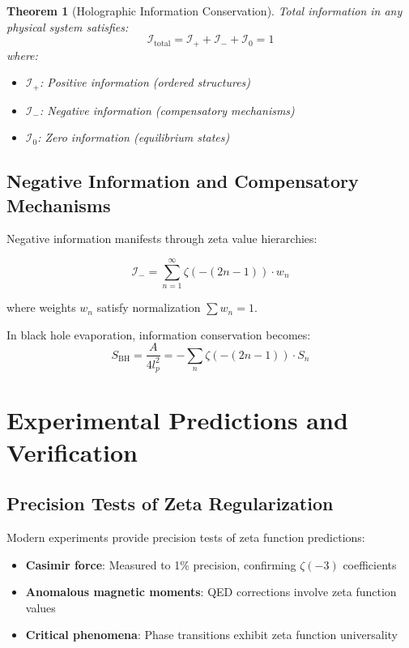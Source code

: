 \documentclass[12pt]{article}
\newtheorem{theorem}{Theorem}[section]
\begin{document}
\begin{theorem}[Holographic Information Conservation]
Total information in any physical system satisfies:
$$\mathcal{I}_{\text{total}} = \mathcal{I}_+ + \mathcal{I}_- + \mathcal{I}_0 = 1$$
where:
\begin{itemize}
\item $\mathcal{I}_+$: Positive information (ordered structures)
\item $\mathcal{I}_-$: Negative information (compensatory mechanisms)
\item $\mathcal{I}_0$: Zero information (equilibrium states)
\end{itemize}
\end{theorem}

\subsection{Negative Information and Compensatory Mechanisms}

Negative information manifests through zeta value hierarchies:

$$\mathcal{I}_- = \sum_{n=1}^{\infty} \zeta(-(2n-1)) \cdot w_n$$

where weights $w_n$ satisfy normalization $\sum w_n = 1$.

In black hole evaporation, information conservation becomes:
$$S_{\text{BH}} = \frac{A}{4l_p^2} = -\sum_{n} \zeta(-(2n-1)) \cdot S_n$$

\section{Experimental Predictions and Verification}

\subsection{Precision Tests of Zeta Regularization}

Modern experiments provide precision tests of zeta function predictions:

\begin{itemize}
\item \textbf{Casimir force}: Measured to 1\% precision, confirming $\zeta(-3)$ coefficients
\item \textbf{Anomalous magnetic moments}: QED corrections involve zeta function values
\item \textbf{Critical phenomena}: Phase transitions exhibit zeta function universality
\end{itemize}
\end{document}
